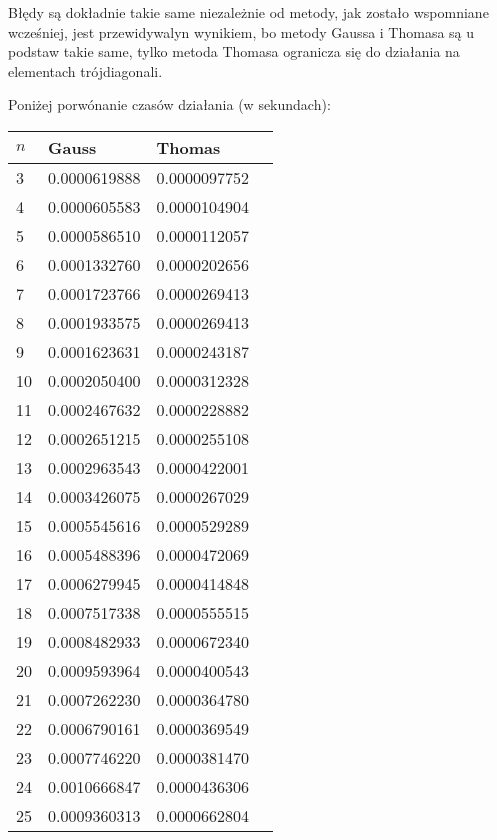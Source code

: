\documentclass{article}
\begin{document}
Błędy są dokładnie takie same niezależnie od metody, jak zostało wspomniane wcześniej, jest przewidywalyn wynikiem, bo metody Gaussa
i Thomasa są u podstaw takie same, tylko metoda Thomasa ogranicza się do działania na elementach trójdiagonali.

Poniżej porwónanie czasów działania (w sekundach):

\newpage
\thispagestyle{empty}

\begin{table}[H]
\parbox{.45\linewidth}{
\hspace*{-1cm}
\begin{tabular}{|l|l|l|l|}
\hline
$n$ & Gauss & Thomas \\ \hline
3 & 0.0000619888 & 0.0000097752 \\ \hline
4 & 0.0000605583 & 0.0000104904 \\ \hline
5 & 0.0000586510 & 0.0000112057 \\ \hline
6 & 0.0001332760 & 0.0000202656 \\ \hline
7 & 0.0001723766 & 0.0000269413 \\ \hline
8 & 0.0001933575 & 0.0000269413 \\ \hline
9 & 0.0001623631 & 0.0000243187 \\ \hline
10 & 0.0002050400 & 0.0000312328 \\ \hline
11 & 0.0002467632 & 0.0000228882 \\ \hline
12 & 0.0002651215 & 0.0000255108 \\ \hline
13 & 0.0002963543 & 0.0000422001 \\ \hline
14 & 0.0003426075 & 0.0000267029 \\ \hline
15 & 0.0005545616 & 0.0000529289 \\ \hline
16 & 0.0005488396 & 0.0000472069 \\ \hline
17 & 0.0006279945 & 0.0000414848 \\ \hline
18 & 0.0007517338 & 0.0000555515 \\ \hline
19 & 0.0008482933 & 0.0000672340 \\ \hline
20 & 0.0009593964 & 0.0000400543 \\ \hline
21 & 0.0007262230 & 0.0000364780 \\ \hline
22 & 0.0006790161 & 0.0000369549 \\ \hline
23 & 0.0007746220 & 0.0000381470 \\ \hline
24 & 0.0010666847 & 0.0000436306 \\ \hline
25 & 0.0009360313 & 0.0000662804 \\ \hline

\end{tabular}}
\end{table}
\end{document}

